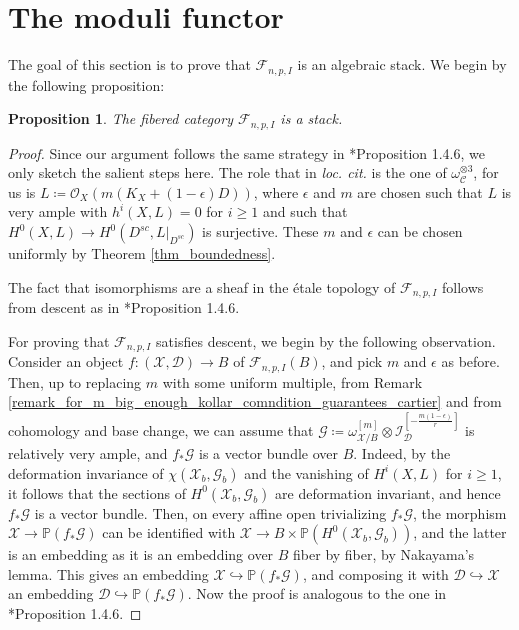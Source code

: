 \documentclass{amsart}
\newcommand{\bP}{\mathbb{P}}
\newcommand{\sC}{\mathscr{C}}
\newcommand{\sF}{\mathscr{F}}
\newcommand{\cD}{\mathcal{D}}
\newcommand{\cG}{\mathcal{G}}
\newcommand{\cI}{\mathcal{I}}
\newcommand{\cO}{\mathcal{O}}
\newcommand{\cX}{\mathcal{X}}
\newtheorem{Prop}[theorem]{Proposition}
\theoremstyle{definition}
\newcommand{\rar}{\rightarrow}
\begin{document}
\section{The moduli functor}
\label{section functor}


The goal of this section is to prove that $\sF_{n,p,I}$ is an algebraic stack. We begin by the following proposition:


\begin{Prop}
The fibered category $\sF_{n,p,I}$ is a stack.
\end{Prop}

\begin{proof}
Since our argument follows the same strategy in \cite{Alp21}*{Proposition 1.4.6}, we only sketch the salient steps here.
The role that in \emph{loc. cit.} is the one of $\omega_\sC^{\otimes 3}$, for us is $L \coloneqq \cO_{X}(m(K_X + (1-\epsilon)D))$, where $\epsilon$ and $m$ are chosen such that $L$ is very ample with $h^i(X,L)=0$ for $i \geq 1$ and such that $H^0(X,L)\to H^0(D^{sc},L|_{D^{sc}})$ is surjective.
These $m$ and $\epsilon$ can be chosen uniformly by Theorem \ref{thm_boundedness}. 

The fact that isomorphisms are a sheaf in the \'etale topology of $\sF_{n,p,I}$ follows from descent as in \cite{Alp21}*{Proposition 1.4.6}.

For proving that $\sF_{n,p,I}$ satisfies descent, we begin by the following observation.
Consider an object $f \colon (\cX,\cD)\to B$ of $\sF_{n,p,I}(B)$, and pick $m$ and $\epsilon$ as before. 
Then, up to replacing $m$ with some uniform multiple, from Remark \ref{remark_for_m_big_enough_kollar_comndition_guarantees_cartier} and from cohomology and base change, we can assume that $\cG \coloneqq \omega_{\cX/B}^{[m]}\otimes \cI_\cD^{[-\frac{m(1-\epsilon)}{r}]}$ is relatively very ample, and $f_*\cG$ is a vector bundle over $B$.
Indeed, by the deformation invariance of $\chi(\cX_b,\cG_b)$ and the vanishing of $H^i(X,L)$ for $i \geq 1$, it follows that the sections of $H^0(\cX_b,\cG_b)$ are deformation invariant, and hence $f_*\cG$ is a vector bundle.
Then, on every affine open trivializing $f_*\cG$, the morphism $\cX \rar \bP(f_*\cG)$ can be identified with $\cX \rar B \times \bP (H^0(\cX_b,\cG_b))$, and the latter is an embedding as it is an embedding over $B$ fiber by fiber, by Nakayama's lemma.
This gives an embedding $\cX\hookrightarrow \bP(f_*\cG)$, and composing it with $\cD\hookrightarrow \cX$ an embedding $\cD\hookrightarrow \bP(f_*\cG)$.
Now the proof is analogous to the one in \cite{Alp21}*{Proposition 1.4.6}.
\end{proof}
\end{document}
